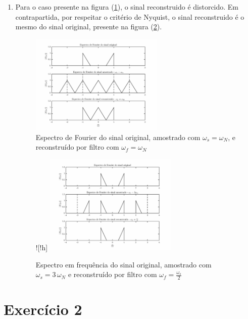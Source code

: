 \documentclass{article}
\begin{document}
\begin{enumerate}
\item %

Para o caso presente na figura (\ref{fig:ex1d1}), o sinal reconstruido é distorcido. Em contrapartida, por respeitar o critério de Nyquist, o sinal reconstruido é o mesmo do sinal original, presente na figura (\ref{fig:ex1d2}).

\begin{figure}[!h]
    \centering
    \includegraphics[width=0.6\textwidth]{./images/ex1d1.eps}
    \caption{Espectro de Fourier do sinal original, amostrado com $\omega_s = \omega_N$, e reconstruído por  filtro com $\omega_f = \omega_N$}
    \label{fig:ex1d1}
\end{figure}%

\begin{figure}![!h]
    \centering
    \includegraphics[width=0.6\textwidth]{./images/ex1d2.eps}
    \caption{Espectro em frequência do sinal original, amostrado com $\omega_s = 3 \, \omega_N$ e reconstruído por  filtro com $\omega_f = \frac{\omega_s}{2}$}
    \label{fig:ex1d2}
\end{figure}

\end{enumerate}

\section*{Exercício 2}
\end{document}

